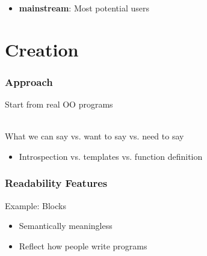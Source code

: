 \documentclass{beamer}
\begin{document}

\begin{frame}

\begin{itemize}
  \item \textbf{mainstream}: Most potential users
\end{itemize}


\end{frame}


\section[Creation]{Creation}


\begin{frame}

\frametitle{Approach}

Start from real OO programs\\~\

What we can say vs. want to say vs. need to say
\begin{itemize}
\item Introspection vs. templates vs. function definition
\end{itemize}

\end{frame}


\begin{frame}[fragile]

\frametitle{Readability Features}

Example: Blocks
\begin{itemize}
	\item Semantically meaningless
	\item Reflect how people write programs
\end{itemize}

\end{frame}
\end{document}
